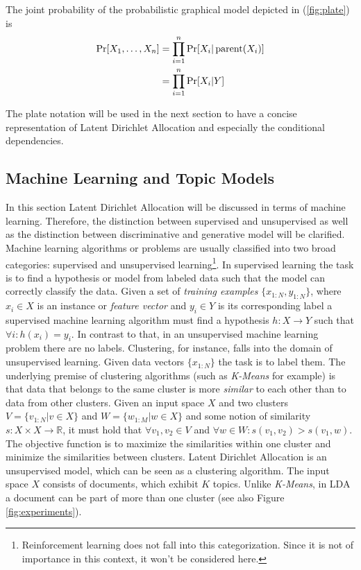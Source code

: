 \documentclass[a4paper,ngerman, english]{atseminar}
\DeclareMathOperator{\parent}{parent}
\begin{document}
The joint probability of the probabilistic graphical model depicted in (\autoref{fig:plate}) is
\begin{align}
\Pr[X_1,\ldots,X_n] &=\prod_{i=1}^n\Pr[X_i | \parent(X_i)] \\
                            &= \prod_{i=1}^n\Pr[X_i | Y] \notag
\end{align}

The plate notation will be used in the next section to have a concise representation of
Latent Dirichlet Allocation and especially the conditional dependencies.

%
\subsection{Machine Learning and Topic Models} \label{sec:ml}
In this section Latent Dirichlet Allocation will be discussed in terms of machine learning. Therefore, 
the distinction between supervised and unsupervised as well as the distinction between discriminative and generative model will
be clarified.\\
Machine learning algorithms or problems are usually classified into two broad categories: supervised and unsupervised learning\footnote{Reinforcement learning does not fall into this categorization. Since it is not of importance in this context, it won't be considered here.}. In supervised learning the task is to find a hypothesis or model from labeled data such that the model can correctly classify the data. Given a set of \textit{training examples} $\{x_{1:N}, y_{1:N}\}$, where $x_i \in X$ is an instance or \textit{feature vector} and $y_i \in Y$ is its corresponding label a supervised machine learning algorithm must find a hypothesis $h: X \rightarrow Y$ such that $\forall i: h(x_i) = y_i$.
In contrast to that, in an unsupervised machine learning problem there are no labels. Clustering, for instance, falls into the domain of unsupervised learning. Given data vectors $\{x_{1:N} \}$ the task is to label them. The underlying premise of clustering algorithms (such as \textit{K-Means} for example) is that data that belongs to the same cluster is more \textit{similar} to each other than to data from other clusters. Given an input space $X$ and two clusters $V = \{v_{1:N} | v \in X \}$ and $W= \{w_{1:M} | w \in X \}$ and some notion of similarity $s: X \times X \rightarrow \mathbb{R}$, it must hold that $\forall v_1, v_2 \in V$ and $\forall w \in W: s(v_1, v_2) > s(v_1, w)$. The objective function is to maximize the similarities within one cluster and minimize the similarities between clusters.
Latent Dirichlet Allocation is an unsupervised model, which can be seen as a clustering algorithm. The input space $X$ consists of documents, which exhibit $K$ topics. Unlike \textit{K-Means}, in LDA a document can be part of more than one cluster (see also Figure \ref{fig:experiments}). 
\end{document}
